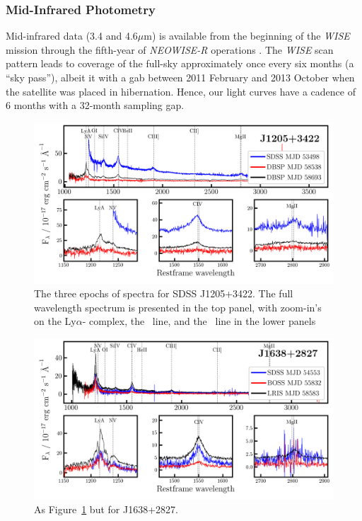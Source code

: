 \documentclass[fleqn,usenatbib]{mnras}
\begin{document}
\subsubsection{Mid-Infrared Photometry}
Mid-infrared data (3.4 and 4.6$\mu$m) is available from the beginning
of the {\it WISE} mission \citep[2010 January; ][]{Wright2010} through
the fifth-year of {\it NEOWISE-R} operations \citep[2018 December;
][]{Mainzer2011}. The {\it WISE} scan pattern leads to coverage of the
full-sky approximately once every six months (a ``sky pass''), albeit
it with a gab between 2011 February and 2013 October when the
satellite was placed in hibernation. Hence, our light curves have a
cadence of 6 months with a 32-month sampling gap.

\begin{figure}
  \centering
  \includegraphics[width=16.7cm, trim=0.3cm 0.05cm 0.30cm 0.1cm, clip]
  {figures/J1205+3422_landscape_spectra.png}
  \vspace{-12pt}
  \caption[]{The three epochs of spectra for SDSS  J1205+3422.
    The full wavelength spectrum is presented in the top panel, 
    with zoom-in's on the Ly$\alpha$-\nv 
    complex, the \civ\ line, and the \mgii\ line in the lower panels}
  \label{fig:civ_clqs_J12_spec}
\end{figure}

\begin{figure}
  \centering
  \includegraphics[width=16.7cm, trim=0.3cm 0.05cm 0.30cm 0.1cm, clip]
  {figures/J1638+2827_landscape_spectra.png}
  \vspace{-12pt}
  \caption[]{As Figure~\ref{fig:civ_clqs_J12_spec} but for  J1638+2827.}
  \label{fig:civ_clqs_J16_spec}
\end{figure}
\end{document}
